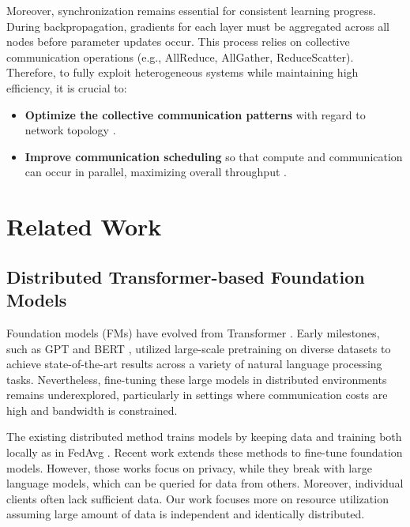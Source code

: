 \documentclass{article}
\begin{document}
Moreover, synchronization remains essential for consistent learning progress. During backpropagation, gradients for each layer must be aggregated across all nodes before parameter updates occur. This process relies on collective communication operations \cite{won2024tacos, cho2019blueconnect} (e.g., AllReduce, AllGather, ReduceScatter). Therefore, to fully exploit heterogeneous systems while maintaining high efficiency, it is crucial to: \begin{itemize} 
\item \textbf{Optimize the collective communication patterns} with regard to network topology \cite{neglia2019role}. 
\item \textbf{Improve communication scheduling} so that compute and communication can occur in parallel, maximizing overall throughput \cite{won2024tacos}. 
\end{itemize}





\section{Related Work}

\subsection{Distributed Transformer-based Foundation Models}

Foundation models (FMs) have evolved from Transformer \cite{vaswani2017attention}. Early milestones, such as GPT \cite{radford2018improving} and BERT \cite{devlin2018bert}, utilized large-scale pretraining on diverse datasets to achieve state-of-the-art results across a variety of natural language processing tasks. Nevertheless, fine-tuning these large models in distributed environments remains underexplored, particularly in settings where communication costs are high and bandwidth is constrained.

The existing distributed method trains models by keeping data and training both locally as in FedAvg \cite{mcmahan2017communication}. Recent work \cite{zhuang2023foundation, ren2024advances} extends these methods to fine-tune foundation models. However, those works focus on privacy, while they break with large language models, which can be queried for data from others. Moreover, individual clients often lack sufficient data. Our work focuses more on resource utilization assuming large amount of data is independent and identically distributed.
\end{document}
